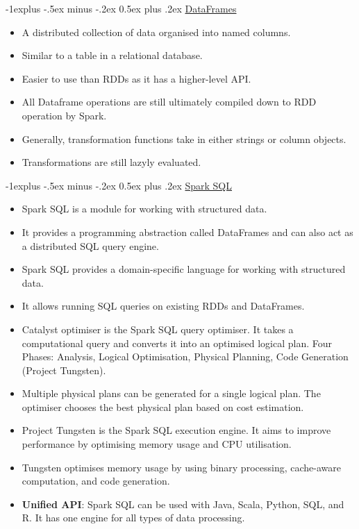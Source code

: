 \documentclass[10pt, landscape]{article}
\makeatletter
\renewcommand{\subsection}{\@startsection{subsection}{2}{0mm}%
  {-1explus -.5ex minus -.2ex}%
  {0.5ex plus .2ex}%
{\normalfont\normalsize\bfseries}}
\makeatother
\begin{document}
\begin{multicols*}{4}
  \subsection{\underline{DataFrames}}
  \begin{itemize}
    \item A distributed collection of data organised into named columns.
    \item Similar to a table in a relational database.
    \item Easier to use than RDDs as it has a higher-level API.
    \item All Dataframe operations are still ultimately compiled down to RDD operation by Spark.
    \item Generally, transformation functions take in either strings or column objects.
    \item Transformations are still lazyly evaluated.
  \end{itemize}

  \subsection{\underline{Spark SQL}}

  \begin{itemize}
    \item Spark SQL is a module for working with structured data.
    \item It provides a programming abstraction called DataFrames and can also act as a distributed SQL query engine.
    \item Spark SQL provides a domain-specific language for working with structured data.
    \item It allows running SQL queries on existing RDDs and DataFrames.
    \item Catalyst optimiser is the Spark SQL query optimiser. It takes a computational query and converts it into an optimised logical plan. Four Phases: Analysis, Logical Optimisation, Physical Planning, Code Generation (Project Tungsten).
    \item Multiple physical plans can be generated for a single logical plan. The optimiser chooses the best physical plan based on cost estimation.
    \item Project Tungsten is the Spark SQL execution engine. It aims to improve performance by optimising memory usage and CPU utilisation.
    \item Tungsten optimises memory usage by using binary processing, cache-aware computation, and code generation.
    \item \textbf{Unified API}: Spark SQL can be used with Java, Scala, Python, SQL, and R. It has one engine for all types of data processing.
  \end{itemize}


\end{multicols*}
\end{document}
